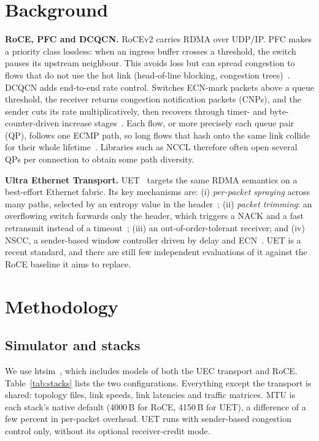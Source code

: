 \documentclass[conference]{IEEEtran}
\begin{document}
\section{Background}

\textbf{RoCE, PFC and DCQCN.}
RoCEv2 carries RDMA over UDP/IP. PFC makes a priority class lossless: when an
ingress buffer crosses a threshold, the switch pauses its upstream neighbour.
This avoids loss but can spread congestion to flows that do not use the hot
link (head-of-line blocking, congestion trees)~\cite{rdma-scale}. DCQCN adds
end-to-end rate control. Switches ECN-mark packets above a queue threshold, the
receiver returns congestion notification packets (CNPs), and the sender cuts its
rate multiplicatively, then recovers through timer- and byte-counter-driven
increase stages~\cite{dcqcn}. Each flow, or more precisely each queue pair
(QP), follows one ECMP path, so long flows that hash onto the same link collide
for their whole lifetime~\cite{hedera}. Libraries such as NCCL therefore often
open several QPs per connection to obtain some path diversity.

\textbf{Ultra Ethernet Transport.}
UET~\cite{uec-spec,uec-design} targets the same RDMA semantics on a best-effort
Ethernet fabric. Its key mechanisms are:
(i) \emph{per-packet spraying} across many paths, selected by an entropy value
in the header~\cite{spray,reps};
(ii) \emph{packet trimming}: an overflowing switch forwards only the header,
which triggers a NACK and a fast retransmit instead of a timeout~\cite{ndp};
(iii) an out-of-order-tolerant receiver; and
(iv) NSCC, a sender-based window controller driven by delay and
ECN~\cite{reps}. UET is a recent standard, and there are still few independent
evaluations of it against the RoCE baseline it aims to replace.

\section{Methodology}
\label{sec:method}

\subsection{Simulator and stacks}
We use htsim~\cite{ndp}, which includes models of both the UEC transport and
RoCE. Table~\ref{tab:stacks} lists the two configurations. Everything except
the transport is shared: topology files, link speeds, link latencies and
traffic matrices. MTU is each stack's native default (4000\,B for RoCE, 4150\,B
for UET), a difference of a few percent in per-packet overhead. UET runs with
sender-based congestion control only, without its optional receiver-credit
mode.
\end{document}
